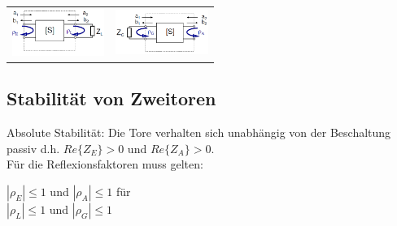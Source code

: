 \documentclass[english]{latex4ei/latex4ei_sheet}
\begin{document}
\begin{sectionbox}
    \begin{tabular*}{\columnwidth}{cc}
        \includegraphics[width = 3cm]{./img/eingangsrefl.png} & \includegraphics[width = 3cm]{./img/ausgangsrefl.png}
    \end{tabular*}
\end{sectionbox}

\begin{sectionbox}
    \subsection{Stabilität von Zweitoren}
    Absolute Stabilität: Die Tore verhalten sich unabhängig von der Beschaltung passiv d.h. $Re\{Z_E\} > 0$ und $Re\{Z_A\} > 0$.\\
    Für die Reflexionsfaktoren muss gelten:\\
    \begin{emphbox}
        $|\rho_E| \leq  1$ und $|\rho_A| \leq  1$ für\\

        $|\rho_L| \leq  1$ und $|\rho_G| \leq  1$
    \end{emphbox}
\end{sectionbox}


\end{document}
